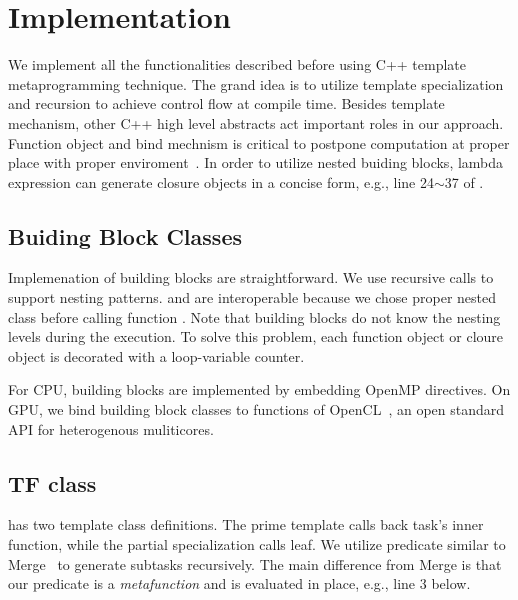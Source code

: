 \section{Implementation}
\label{sec:details}

We implement all the functionalities described before using C++
template metaprogramming technique. The grand idea is to utilize
template specialization and recursion to achieve control flow at
compile time. Besides template mechanism, other  C++ high level
abstracts act important roles in our approach. Function object and bind
mechnism is critical to postpone computation at proper place with
proper enviroment~\cite{moderncpp}. In order to utilize nested buiding blocks,
lambda expression can generate closure objects in a concise
form, e.g., line 24$\sim$37 of .

\subsection{Buiding Block Classes}

Implemenation of building blocks are straightforward. We use recursive calls
to support nesting patterns.  and  are interoperable
because we chose proper nested class before calling function . Note that
building blocks do not know the nesting levels during the execution. To solve this
problem, each function object or cloure object is decorated with a loop-variable
counter.

For CPU, building blocks are implemented by embedding OpenMP directives. On GPU, we bind
building block classes to functions of OpenCL~\cite{opencl}, an open standard API
for heterogenous muliticores.

\subsection{TF class}

 has two template class definitions. The prime template
calls back task's inner function, while the partial specialization calls
leaf. We utilize predicate similar to Merge~\cite{merge} to generate subtasks
recursively. The main difference from Merge is that our predicate is a
\emph{metafunction} and is evaluated in place, e.g., line 3 below.

